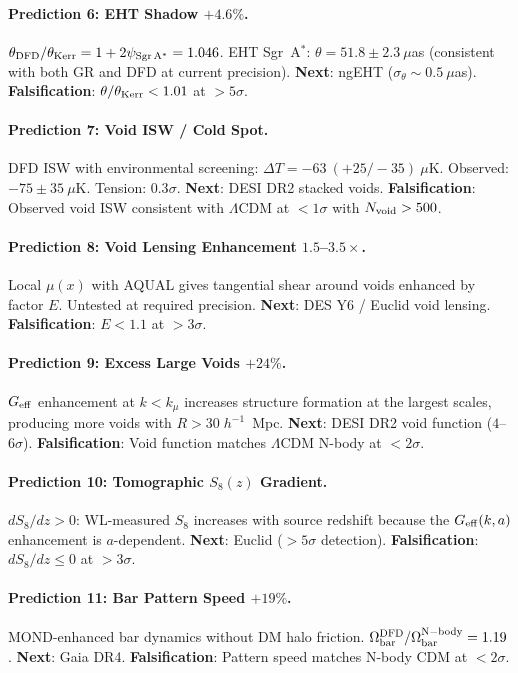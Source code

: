 \documentclass[11pt,a4paper]{article}
\newcommand{\Geff}{G_{\rm eff}}
\newcommand{\kmu}{k_\mu}
\begin{document}
\paragraph{Prediction 6: EHT Shadow $+4.6\%$.}
$\theta_{\rm DFD}/\theta_{\rm Kerr} = 1 + 2\psi_{\rm Sgr\,A^*}
= 1.046$.  EHT Sgr~A$^*$: $\theta = 51.8 \pm 2.3~\mu$as
(consistent with both GR and DFD at current precision).
\textbf{Next}: ngEHT ($\sigma_\theta \sim 0.5~\mu$as).
\textbf{Falsification}: $\theta/\theta_{\rm Kerr} < 1.01$ at
$> 5\sigma$.

\paragraph{Prediction 7: Void ISW / Cold Spot.}
DFD ISW with environmental screening: $\Delta T = -63~(+25/-35)~\mu$K.
Observed: $-75 \pm 35~\mu$K.  Tension: $0.3\sigma$.
\textbf{Next}: DESI DR2 stacked voids.
\textbf{Falsification}: Observed void ISW consistent with
$\Lambda$CDM at $< 1\sigma$ with $N_{\rm void} > 500$.

\paragraph{Prediction 8: Void Lensing Enhancement $1.5$--$3.5\times$.}
Local $\mu(x)$ with AQUAL gives tangential shear around voids
enhanced by factor $E$.  Untested at required precision.
\textbf{Next}: DES Y6 / Euclid void lensing.
\textbf{Falsification}: $E < 1.1$ at $> 3\sigma$.

\paragraph{Prediction 9: Excess Large Voids $+24\%$.}
$\Geff$ enhancement at $k < \kmu$ increases structure formation
at the largest scales, producing more voids with $R > 30\;h^{-1}$~Mpc.
\textbf{Next}: DESI DR2 void function ($4$--$6\sigma$).
\textbf{Falsification}: Void function matches $\Lambda$CDM N-body
at $< 2\sigma$.

\paragraph{Prediction 10: Tomographic $S_8(z)$ Gradient.}
$dS_8/dz > 0$: WL-measured $S_8$ increases with source redshift
because the $\Geff(k,a)$ enhancement is $a$-dependent.
\textbf{Next}: Euclid ($> 5\sigma$ detection).
\textbf{Falsification}: $dS_8/dz \leq 0$ at $> 3\sigma$.

\paragraph{Prediction 11: Bar Pattern Speed $+19\%$.}
MOND-enhanced bar dynamics without DM halo friction.
$\Omega_{\rm bar}^{\rm DFD}/\Omega_{\rm bar}^{\rm N-body} = 1.19$.
\textbf{Next}: Gaia DR4.
\textbf{Falsification}: Pattern speed matches N-body CDM at $< 2\sigma$.
\end{document}
